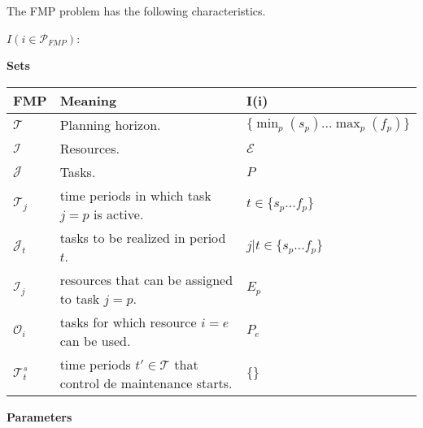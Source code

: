\documentclass[a4paper,11pt]{article}
\begin{document}



    The FMP problem has the following characteristics.

    $I(i \in \mathcal{P}_{FMP})$:

    \vskip 0.3cm

    \textbf{Sets}

    \begin{tabular}{l|l|l}
    	\textbf{FMP}    &  \textbf{Meaning} & \textbf{I(i)} \\ \hline
        $\mathcal{T}$    &  Planning horizon. & $\{\min_p({s_p}) ... \max_p({f_p})\}$ \\
        $\mathcal{I}$    &  Resources. & $ \mathcal{E}$ \\
        $\mathcal{J}$    &  Tasks.  & $ P$ \\
        $\mathcal{T}_j$  &  time periods in which task $j=p$ is active. & $t \in \{s_p ... f_p\}$ \\
        $\mathcal{J}_t$  &  tasks to be realized in period $t$. & $j | t \in \{s_p ... f_p\}$ \\
        $\mathcal{I}_j$  &  resources that can be assigned to task $j=p$. & $E_p$\\
        $\mathcal{O}_i$  &  tasks for which resource $i=e$ can be used. & $P_e$ \\
        $\mathcal{T}^{s}_t$ &  time periods $t' \in \mathcal{T}$ that control de maintenance starts. & $\{\}$ \\
    \end{tabular}

    \vskip 0.3cm

    \textbf{Parameters}
\end{document}

